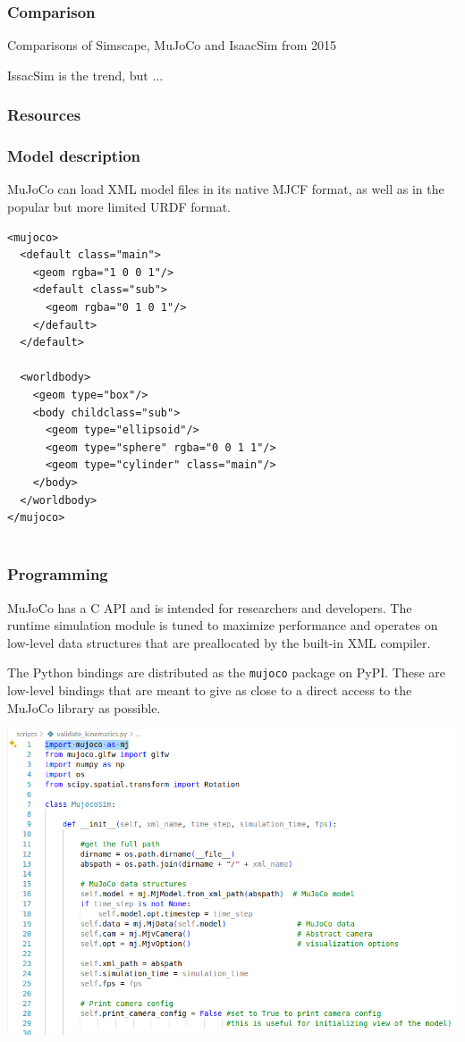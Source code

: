 \documentclass[9pt]{beamer}
\begin{document}
	\begin{frame}
		\frametitle{Comparison}
			Comparisons of Simscape, MuJoCo and IsaacSim from 2015
			
			\scalebox{0.63}{}
			
			IssacSim is the trend, but ...
	\end{frame}


	\begin{frame}
		\frametitle{Resources}
		\scalebox{0.8}{}
	\end{frame}
	
	\begin{frame}[fragile]
		\frametitle{Model description}
		MuJoCo can load XML model files in its native MJCF format, as well as in the popular but more limited URDF format.
	\begin{verbatim}
<mujoco>
  <default class="main">
    <geom rgba="1 0 0 1"/>
    <default class="sub">
      <geom rgba="0 1 0 1"/>
    </default>
  </default>
	
  <worldbody>
    <geom type="box"/>
    <body childclass="sub">
      <geom type="ellipsoid"/>
      <geom type="sphere" rgba="0 0 1 1"/>
      <geom type="cylinder" class="main"/>
    </body>
  </worldbody>
</mujoco>
		
	\end{verbatim}
	\end{frame}
	
	\begin{frame}
		\frametitle{Programming}
		MuJoCo has a C API and is intended for researchers and developers. The runtime simulation module is tuned to maximize performance and operates on low-level data structures that are preallocated by the built-in XML compiler. 
		
		The Python bindings are distributed as the \texttt{mujoco} package on PyPI. These are low-level bindings that are meant to give as close to a direct access to the MuJoCo library as possible.
		
		\begin{center}
			\includegraphics[width=0.7\linewidth]{images/gg-colab}
		\end{center}
	\end{frame}
\end{document}
